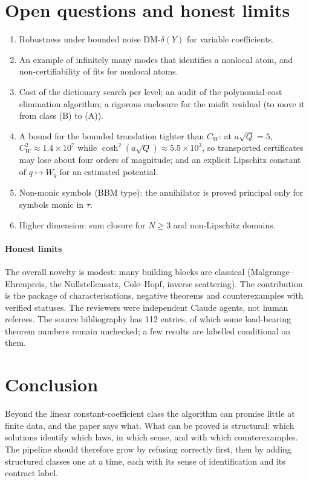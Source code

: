 \section{Open questions and honest limits}\label{sec:open}
\begin{enumerate}
\item Robustness under bounded noise $\mathrm{DM}\text{-}\delta(Y)$ for variable coefficients.
\item An example of infinitely many modes that identifies a nonlocal atom, and non-certifiability of fits for nonlocal atoms.
\item Cost of the dictionary search per level; an audit of the polynomial-cost elimination algorithm; a rigorous enclosure for the misfit residual (to move it from class (B) to (A)).
\item A bound for the bounded translation tighter than $C_W$: at $a\sqrt Q=5$, $C_W^2\approx1.4\times10^7$ while $\cosh^2(a\sqrt Q)\approx5.5\times10^3$, so transported certificates may lose about four orders of magnitude; and an explicit Lipschitz constant of $q\mapsto W_q$ for an estimated potential.
\item Non-monic symbols (BBM type): the annihilator is proved principal only for symbols monic in $\tau$.
\item Higher dimension: sum closure for $N\ge3$ and non-Lipschitz domains.
\end{enumerate}
\paragraph{Honest limits} The overall novelty is modest: many building blocks are classical (Malgrange--Ehrenpreis, the Nullstellensatz, Cole--Hopf, inverse scattering). The contribution is the package of characterisations, negative theorems and counterexamples with verified statuses. The reviewers were independent Claude agents, not human referees.
The source bibliography has 112 entries, of which some load-bearing theorem numbers remain unchecked; a few results are labelled conditional on them.

\section{Conclusion}\label{sec:conclusion}
Beyond the linear constant-coefficient class the algorithm can promise little at finite data, and the paper says what. What can be proved is structural: which solutions identify which laws, in which sense, and with which counterexamples.
The pipeline should therefore grow by refusing correctly first, then by adding structured classes one at a time, each with its sense of identification and its contract label.

\appendix


